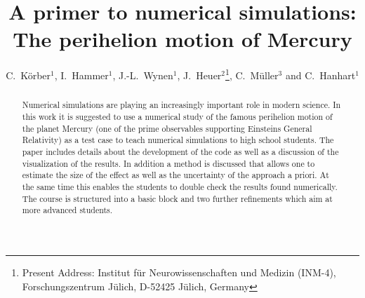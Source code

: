 \documentclass[12pt,ngerman,american]{iopart}
\begin{document}
\title[A primer to numerical simulations]{A primer to numerical simulations: The perihelion motion of Mercury}

\author{
	C.~K\"orber$^{1}$,
	I.~Hammer$^{1}$,
	J.-L.~Wynen$^{1}$,
	J.~Heuer$^{2}$\footnote{Present Address: Institut f\"ur Neurowissenschaften und Medizin (INM-4), Forschungszentrum J\"ulich, D-52425 J\"ulich, Germany},
	C.~M\"uller$^{3}$ and
	C.~Hanhart$^{1}$
}
\address{
	$^1$ \textit{Institut f\"ur Kernphysik (IKP-3) and Institute for Advanced Simulations (IAS-4), Forschungszentrum J\"ulich, D-52425 J\"ulich, Germany}\\
	$^2$ \textit{Hochschule Hamm-Lippstadt, Marker Allee 76-78, 59063 Hamm, Germany}\\
	$^3$ \textit{Sch\"ulerlabor JuLab, Forschungszentrum J\"ulich, D-52425 J\"ulich, Germany}
}
\vspace{10pt}

\begin{abstract}
Numerical simulations are playing an increasingly important role in modern science.
In this work it is suggested to use a numerical study of the famous perihelion motion of the planet Mercury (one of the prime observables supporting Einsteins General Relativity) as a test case to teach numerical simulations to high school students.
The paper includes details about the development of the code as well as a discussion of the visualization of the results.
In addition a method is discussed that allows one to estimate the size of the effect as well as the uncertainty of 
the approach a priori. At the same time this enables the students to double check the results found numerically.
The course is structured into a basic block and two further refinements which aim at more advanced students.
\end{abstract}

%
%
%
% 
%
\end{document}

